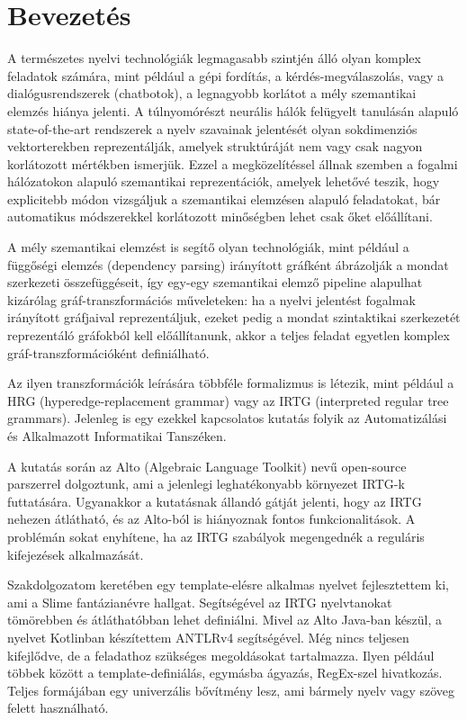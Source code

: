 \chapter{Bevezetés}
\label{sec:introducton}


A természetes nyelvi technológiák legmagasabb szintjén álló olyan komplex feladatok számára, mint például a gépi fordítás, a kérdés-megválaszolás, vagy a dialógusrendszerek (chatbotok), a legnagyobb korlátot a mély szemantikai elemzés hiánya jelenti. A túlnyomórészt neurális hálók felügyelt tanulásán alapuló state-of-the-art rendszerek a nyelv szavainak jelentését olyan sokdimenziós vektorterekben reprezentálják, amelyek struktúráját nem vagy csak nagyon korlátozott mértékben ismerjük. Ezzel a megközelítéssel állnak szemben a fogalmi hálózatokon alapuló szemantikai reprezentációk, amelyek lehetővé teszik, hogy explicitebb módon vizsgáljuk a szemantikai elemzésen alapuló feladatokat, bár automatikus módszerekkel korlátozott minőségben lehet csak őket előállítani.

A mély szemantikai elemzést is segítő olyan technológiák, mint például a függőségi elemzés (dependency parsing) irányított gráfként ábrázolják a mondat szerkezeti összefüggéseit, így egy-egy szemantikai elemző pipeline alapulhat kizárólag gráf-transzformációs műveleteken: ha a nyelvi
jelentést fogalmak irányított gráfjaival reprezentáljuk, ezeket pedig a mondat szintaktikai
szerkezetét reprezentáló gráfokból kell előállítanunk, akkor a teljes feladat egyetlen komplex
gráf-transzformációként definiálható.

Az ilyen transzformációk leírására többféle formalizmus is létezik, mint például a HRG (hyperedge-replacement grammar) vagy az IRTG (interpreted regular tree grammars). Jelenleg is egy ezekkel kapcsolatos kutatás folyik az Automatizálási és Alkalmazott Informatikai Tanszéken.

A kutatás során az Alto (Algebraic Language Toolkit) nevű open-source parszerrel dolgoztunk, ami a jelenlegi leghatékonyabb környezet IRTG-k futtatására. Ugyanakkor a kutatásnak állandó gátját jelenti, hogy az IRTG nehezen átlátható, és az Alto-ból is hiányoznak fontos funkcionalitások. A problémán sokat enyhítene, ha az IRTG szabályok megengednék a reguláris kifejezések alkalmazását.

Szakdolgozatom keretében egy template-elésre alkalmas nyelvet fejlesztettem ki, ami a Slime fantázianévre hallgat. Segítségével az IRTG nyelvtanokat tömörebben és átláthatóbban lehet definiálni. Mivel az Alto Java-ban készül, a nyelvet Kotlinban készítettem ANTLRv4 segítségével. Még nincs teljesen kifejlődve, de a feladathoz szükséges megoldásokat tartalmazza. Ilyen például többek között a template-definiálás, egymásba ágyazás, RegEx-szel hivatkozás. Teljes formájában egy univerzális bővítmény lesz, ami bármely nyelv vagy szöveg felett használható.
 	 	 	
